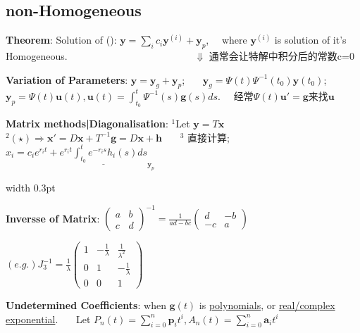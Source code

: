 \documentclass[8pt]{extarticle}
\begin{document}
\subsection{non-Homogeneous}

\begin{minipage}[t]{0.69\textwidth}
    
    \textbf{Theorem}: Solution of (\star): $\mathbf{y}=\sum_ic_i\mathbf{y}^{(i)}+\mathbf{y}_{p}$, \ \ where $\mathbf{y}^{(i)}$ is solution of it's Homogeneous. \ \ \ \ \ \ \ \ \ \ \ \ \ \ \ \ \ \ \ \ \ \ \ \ \ {\tiny $\Downarrow$ 通常会让特解中积分后的常数c=0}

    \textbf{Variation of Parameters}: $\mathbf{y}=\mathbf{y}_g+\mathbf{y}_p$; \ \ \ $\mathbf{y}_g=\Psi(t)\Psi^{-1}(t_0)\mathbf{y}(t_0)$; \ \ \ $\mathbf{y}_p=\Psi(t)\mathbf{u}(t),\mathbf{u}(t)=\int^t_{t_0}\Psi^{-1}(s)\mathbf{g}(s)ds$. \ \ {\scriptsize 经常$\Psi(t)\mathbf{u}'=\mathbf{g}$来找$\mathbf{u}$}
    
    \textbf{Matrix methods|Diagonalisation}: $^1$Let $\mathbf{y}=T\mathbf{x}$ \ \ \ $^2(\star)\Rightarrow \mathbf{x}'=D\mathbf{x}+T^{-1}\mathbf{g}=D\mathbf{x}+\mathbf{h}$ \ \ \ $^3$ {\tiny 直接计算;} $x_i=c_ie^{r_it}+\underline{e^{r_it}\int^t_{t_0}e^{-r_is}h_i(s)ds}_{\mathbf{y}_p}$
    

\end{minipage}
\hfill
\vrule width 0.3pt
\hfill
\begin{minipage}[t]{0.30\textwidth}
    \tiny
    \textbf{Inversse of Matrix}: $\begin{pmatrix}a & b \\ c & d \end{pmatrix}^{-1}=\frac{1}{ad-bc}\begin{pmatrix}d & -b \\ -c & a \end{pmatrix}$
    
    $(e.g.)J_3^{-1}=\frac{1}{\lambda}\begin{pmatrix}1 & -\frac{1}{\lambda} & \frac{1}{\lambda^2} \\ 0 & 1 & -\frac{1}{\lambda} \\ 0 & 0 & 1\end{pmatrix}$

\end{minipage}

\vspace{-7pt}
\textbf{Undetermined Coefficients}: { when $\mathbf{g}(t)$ is \underline{polynomials}, or \underline{real/complex exponential}.} \ \ \ Let { $P_n(t)=\sum^n_{i=0}\mathbf{p}_it^i,A_n(t)=\sum^n_{i=0}\mathbf{a}_it^i$}
\end{document}
